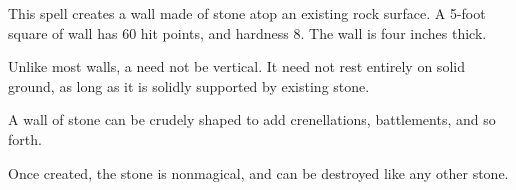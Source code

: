 \begin{spellheader}
    \begin{spelltargetinginfo}
    \end{spelltargetinginfo}
\end{spellheader}
\begin{spellcontent}
    \begin{spelleffects}
        \spelleffect This spell creates a wall made of stone atop an existing rock surface. A 5-foot square of wall has 60 hit points, and hardness 8. The wall is four inches thick.
        \par Unlike most walls, a  need not be vertical. It need not rest entirely on solid ground, as long as it is solidly supported by existing stone.
        \par A wall of stone can be crudely shaped to add crenellations, battlements, and so forth.
    \end{spelleffects}
\end{spellcontent}
\begin{spellfooter}
    \spellnotes Once created, the stone is nonmagical, and can be destroyed like any other stone.
\end{spellfooter}

